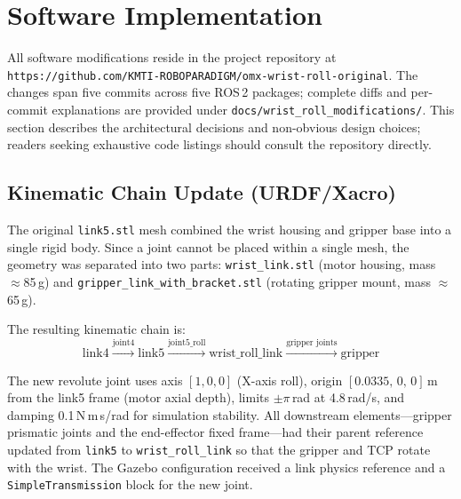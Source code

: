 \documentclass[conference]{IEEEtran}
\begin{document}
	
	\section{Software Implementation}
		
		All software modifications reside in the project repository at
		\texttt{https://github.com/KMTI-ROBOPARADIGM/omx-wrist-roll-original}. The changes span
		five commits across five ROS\,2 packages; complete diffs and
		per-commit explanations are provided under
		\texttt{docs/wrist\_roll\_modifications/}. This section describes the architectural
		decisions and non-obvious design choices; readers seeking exhaustive
		code listings should consult the repository directly.
		
		\subsection{Kinematic Chain Update (URDF/Xacro)}
		
		The original \texttt{link5.stl} mesh combined the wrist housing and
		gripper base into a single rigid body. Since a joint cannot be placed
		within a single mesh, the geometry was separated into two parts:
		\texttt{wrist\_link.stl} (motor housing, mass $\approx$85\,g) and
		\texttt{gripper\_link\_with\_bracket.stl} (rotating gripper mount,
		mass $\approx$65\,g).
		
		The resulting kinematic chain is:
		\begin{equation*}
			\text{link4}
			\xrightarrow{\text{joint4}}
			\text{link5}
			\xrightarrow{\text{joint5\_roll}}
			\text{wrist\_roll\_link}
			\xrightarrow{\text{gripper joints}}
			\text{gripper}
		\end{equation*}
		
		The new revolute joint uses axis $[1,0,0]$ (X-axis roll), origin
		$[0.0335,\,0,\,0]$\,m from the link5 frame (motor axial depth),
		limits $\pm\pi$\,rad at 4.8\,rad/s, and damping
		0.1\,N\,m\,s/rad for simulation stability. All downstream
		elements---gripper prismatic joints and the end-effector fixed
		frame---had their parent reference updated from \texttt{link5} to
		\texttt{wrist\_roll\_link} so that the gripper and TCP rotate with
		the wrist. The Gazebo configuration received a link physics reference
		and a \texttt{SimpleTransmission} block for the new joint.
		
\end{document}
